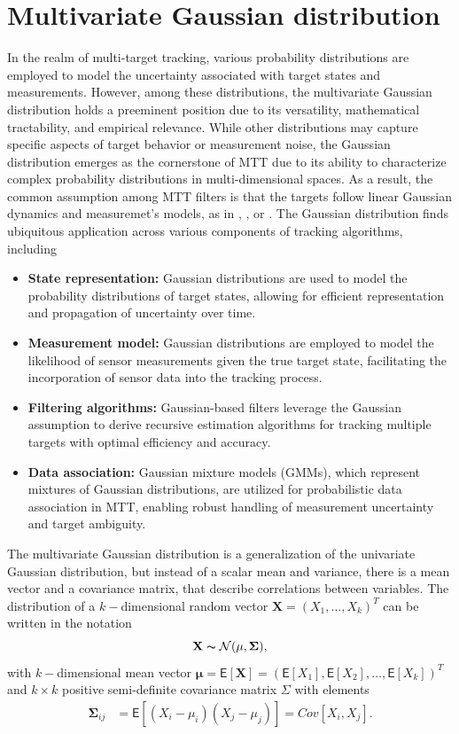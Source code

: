    \section{Multivariate Gaussian distribution}
In the realm of multi-target tracking, various probability distributions are employed to model the uncertainty
associated with target states and measurements. However, among these distributions, the multivariate Gaussian
distribution holds a preeminent position due to its versatility, mathematical tractability, and empirical relevance. While other distributions may capture specific aspects of target behavior or measurement noise, the Gaussian distribution emerges as the cornerstone of MTT due to its ability to characterize complex probability distributions in multi-dimensional spaces. As a result, the common assumption among MTT filters is that the targets follow linear Gaussian dynamics and measuremet's models, as in \cite{bar1995}, \cite{VoMaPHD2006}, or \cite{GarciaPMBM2018}. The Gaussian distribution finds ubiquitous application across various components of tracking algorithms, including
\begin{itemize}
    \item \textbf{State representation:} Gaussian distributions are used to model the probability distributions of target states, allowing for efficient representation and propagation of uncertainty over time.
    \item \textbf{Measurement model:} Gaussian distributions are employed to model the likelihood of sensor measurements given the true target state, facilitating the incorporation of sensor data into the tracking process.
    \item \textbf{Filtering algorithms:} Gaussian-based filters leverage the Gaussian assumption to derive recursive estimation algorithms for tracking multiple targets with optimal efficiency and accuracy.
    \item \textbf{Data association:} Gaussian mixture models (GMMs), which represent mixtures of Gaussian distributions, are utilized for probabilistic data association in MTT, enabling robust handling of measurement uncertainty and target ambiguity.
\end{itemize}
\begin{note}
The multivariate Gaussian distribution is a generalization of the univariate Gaussian distribution, but instead of a scalar mean and variance, there is a mean vector and a covariance matrix, that describe correlations between variables. The distribution of a $k-$dimensional random vector $\mathbf{X} = (X_1,\dots,X_k)^T$ can be written in the notation
\[\mathbf{X} \thicksim \mathcal{N}(\mathbf{\mu}, \mathbf{\Sigma}),\]
with
$k-$dimensional mean vector
$\mathbf{\mu} = \mathsf{E}[\mathbf{X}] = (\mathsf{E}[X_1], \mathsf{E}[X_2], \dots, \mathsf{E}[X_k])^T$
and
$k\times k$ positive semi-definite covariance matrix $\Sigma$ with elements
\begin{align}
    \mathbf{\Sigma}_{ij} &= \mathsf{E}[(X_i - \mu_i)(X_j - \mu_j)] = Cov[X_i, X_j].
\end{align}

\end{note}
